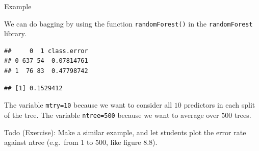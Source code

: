 \documentclass[10pt,ignorenonframetext,]{beamer}
\newenvironment{Shaded}{\begin{snugshade}}{\end{snugshade}}
\newcommand{\KeywordTok}[1]{\textcolor[rgb]{0.13,0.29,0.53}{\textbf{#1}}}
\newcommand{\DataTypeTok}[1]{\textcolor[rgb]{0.13,0.29,0.53}{#1}}
\newcommand{\DecValTok}[1]{\textcolor[rgb]{0.00,0.00,0.81}{#1}}
\newcommand{\StringTok}[1]{\textcolor[rgb]{0.31,0.60,0.02}{#1}}
\newcommand{\OtherTok}[1]{\textcolor[rgb]{0.56,0.35,0.01}{#1}}
\newcommand{\OperatorTok}[1]{\textcolor[rgb]{0.81,0.36,0.00}{\textbf{#1}}}
\newcommand{\NormalTok}[1]{#1}
\begin{document}
\begin{frame}[fragile]

\begin{block}{Example}

\vspace{1mm}

We can do bagging by using the function \texttt{randomForest()} in the
\texttt{randomForest} library.

\scriptsize

\begin{Shaded}
\end{Shaded}

\begin{verbatim}
##     0  1 class.error
## 0 637 54  0.07814761
## 1  76 83  0.47798742
\end{verbatim}

\begin{Shaded}
\end{Shaded}

\begin{verbatim}
## [1] 0.1529412
\end{verbatim}

\normalsize

The variable \texttt{mtry=10} because we want to consider all \(10\)
predictors in each split of the tree. The variable \texttt{ntree=500}
because we want to average over \(500\) trees.

Todo (Exercise): Make a similar example, and let students plot the error
rate against ntree (e.g.~from 1 to 500, like figure 8.8).

\end{block}

\end{frame}
\end{document}
